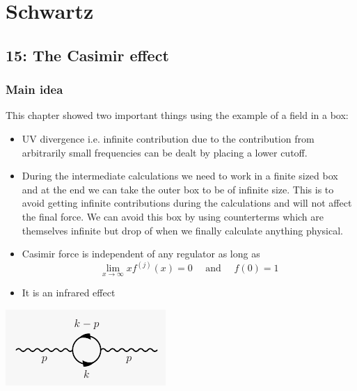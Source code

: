 \chapter{Schwartz}

\section{15: The Casimir effect}

\subsection{Main idea}
This chapter showed two important things using the example of a field in a box:
\begin{itemize}
    \item UV divergence i.e. infinite contribution due to the contribution from arbitrarily small frequencies can be dealt by placing a lower cutoff.
    \item During the intermediate calculations we need to work in a finite sized box and at the end we can take the outer box to be of infinite size. This is to avoid getting infinite contributions during the calculations and will not affect the final force. We can avoid this box by using counterterms which are themselves infinite but drop of when we finally calculate anything physical.
\end{itemize}

\begin{itemize}
    \item Casimir force is independent of any regulator as long as 
    \begin{equation}
        \lim _{x \rightarrow \infty} x f^{(j)}(x)=0 \quad \text { and } \quad f(0)=1
    \end{equation}
    \item It is an infrared effect
\end{itemize}

\includegraphics{chapters/QFT/images/image1.png}
